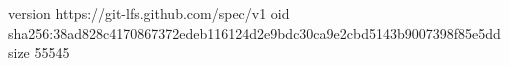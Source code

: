 version https://git-lfs.github.com/spec/v1
oid sha256:38ad828c4170867372edeb116124d2e9bdc30ca9e2cbd5143b9007398f85e5dd
size 55545
